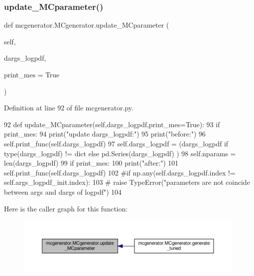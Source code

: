 \subsubsection{\texorpdfstring{update\+\_\+\+M\+Cparameter()}{update\_MCparameter()}}
{\footnotesize\ttfamily def mcgenerator.\+M\+Cgenerator.\+update\+\_\+\+M\+Cparameter (\begin{DoxyParamCaption}\item[{}]{self,  }\item[{}]{dargs\+\_\+logpdf,  }\item[{}]{print\+\_\+mes = {\ttfamily True} }\end{DoxyParamCaption})}



Definition at line 92 of file mcgenerator.\+py.


\begin{DoxyCode}
92     \textcolor{keyword}{def }update\_MCparameter(self,dargs\_logpdf,print\_mes=True):
93         \textcolor{keywordflow}{if} print\_mes:
94             print(\textcolor{stringliteral}{"update dargs\_logpdf:"})
95             print(\textcolor{stringliteral}{"before:"})
96             self.print\_func(self.dargs\_logpdf)
97         self.dargs\_logpdf = (dargs\_logpdf \textcolor{keywordflow}{if} type(dargs\_logpdf) != dict \textcolor{keywordflow}{else} pd.Series(dargs\_logpdf) )
98         self.nparams = len(dargs\_logpdf)
99         \textcolor{keywordflow}{if} print\_mes:
100             print(\textcolor{stringliteral}{"after:"})
101             self.print\_func(self.dargs\_logpdf)
102         \textcolor{comment}{#if np.any(self.dargs\_logpdf.index != self.args\_logpdf\_init.index):}
103         \textcolor{comment}{#    raise TypeError("parameters are not coincide between args and dargs of logpdf")}
104         
\end{DoxyCode}
Here is the caller graph for this function\+:\nopagebreak
\begin{figure}[H]
\begin{center}
\leavevmode
\includegraphics[width=350pt]{d3/dad/classmcgenerator_1_1MCgenerator_ac92600d8782d14be52db33b1259b10b1_icgraph}
\end{center}
\end{figure}
\mbox{\label{classmcgenerator_1_1MCgenerator_a9b7e41d377b67f8c83b34c62059f876d}} 
